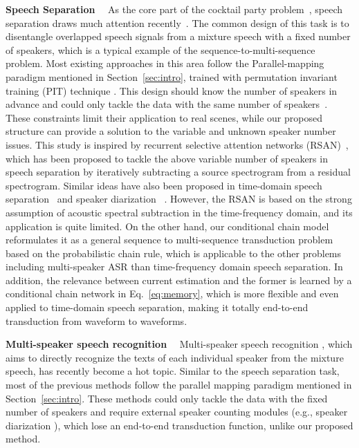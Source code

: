 \documentclass{article}
\begin{document}
\textbf{Speech Separation}\label{ssec:sepration} \ \ As the core part of the cocktail party problem~\cite{cherry1953some}, speech separation draws much attention recently~\cite{hershey2016deep,isik2016single,yu2017permutation,Kolbaek2017Multitalker,Luo2018Speaker,luo2018real-time,luo2018tasnet,luo2019dual}. The common design of this task is to disentangle overlapped speech signals from a mixture speech with a fixed number of speakers, which is a typical example of the sequence-to-multi-sequence problem. Most existing approaches in this area follow the Parallel-mapping paradigm mentioned in Section~\ref{sec:intro}, trained with permutation invariant training (PIT) technique \cite{yu2017permutation}. This design should know the number of speakers in advance and could only tackle the data with the same number of speakers~\cite{shi2018listen}. These constraints limit their application to real scenes, while our proposed structure can provide a solution to the variable and unknown speaker number issues. 
This study is inspired by recurrent selective attention networks (RSAN)~\cite{kinoshita2018listening}, which has been proposed to tackle the above variable number of speakers in speech separation by iteratively subtracting a source spectrogram from a residual spectrogram. Similar ideas have also been proposed in time-domain speech separation~\cite{takahashi2019recursive} and speaker diarization ~\cite{yusuke2020condition}. 
However, the RSAN is based on the strong assumption of acoustic spectral subtraction in the time-frequency domain, and its application is quite limited.
On the other hand, our conditional chain model reformulates it as a general sequence to multi-sequence transduction problem based on the probabilistic chain rule, which is applicable to the other problems including multi-speaker ASR than time-frequency domain speech separation.
In addition, the relevance between current estimation and the former is learned by a conditional chain network in Eq.~\ref{eq:memory}, which is more flexible and even applied to time-domain speech separation, making it totally end-to-end transduction from waveform to waveforms.



\textbf{Multi-speaker speech recognition} \ \ Multi-speaker speech recognition \cite{weng2015deep, yu2017recognizing, seki2018purely, settle2018end}, which aims to directly recognize the texts of each individual speaker from the mixture speech, has recently become a hot topic. Similar to the speech separation task, most of the previous methods follow the parallel mapping paradigm mentioned in Section~\ref{sec:intro}. 
These methods could only tackle the data with the fixed number of speakers and require external speaker counting modules (e.g., speaker diarization \cite{Tranter2006, Anguera2012, Sell2018dihard}), which lose an end-to-end transduction function, unlike our proposed method.
\end{document}
